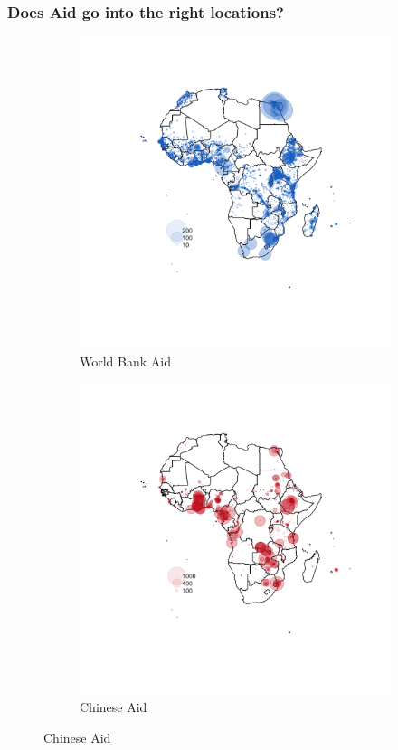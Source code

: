 \documentclass[]{beamer}   	%
\begin{document}
\begin{frame}
\frametitle{Does Aid go into the right locations?}
\begin{figure}[t]
\centering
\caption{Spatial Distribution of Development Aid Projects}

\begin{subfigure}[c]{0.48\textwidth}
\includegraphics[width=\textwidth,trim={15cm 16cm 10cm 8cm},clip]{../../Analysis/output/other_maps/aid_wb.png}
\caption{World Bank Aid}
\label{fig:WB_aid_map}
\end{subfigure}
\begin{subfigure}[c]{0.48\textwidth}
\includegraphics[width=\textwidth,trim={15cm 16cm 10cm 8cm},clip]{../../Analysis/output/other_maps/aid_China.png}
\caption{Chinese Aid}
\label{fig:China_aid_map}
\end{subfigure}


\end{figure}
\end{frame}
\end{document}
